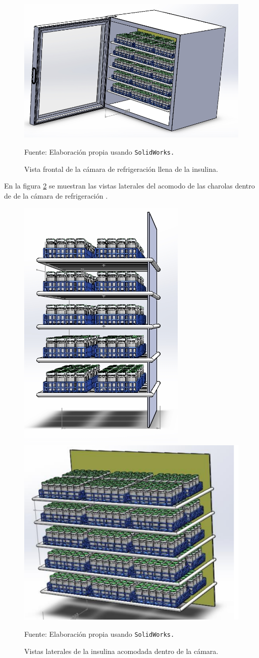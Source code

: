 \begin{figure}[H]
	\centering
	\includegraphics[width=0.6\linewidth]{figures/4-frontalcharolas}
	\caption{Vista frontal de la cámara de refrigeración llena de la insulina.}
	Fuente: Elaboración propia usando \texttt{SolidWorks.}
	\label{fig:4-frontalcharolas}
\end{figure}


En la figura \ref{fig:4-lateralcharolas1} se muestran las vistas laterales del acomodo de las charolas dentro de de la cámara de refrigeración    .

\begin{figure}[H]
	\centering
	\includegraphics[width=0.4\linewidth]{figures/4-lateralcharolas1}\includegraphics[width=0.5\linewidth]{figures/4-lateralcharolas2}
	\caption{Vistas laterales de la insulina acomodada dentro de la cámara.}
		Fuente: Elaboración propia usando \texttt{SolidWorks.}
	\label{fig:4-lateralcharolas1}
\end{figure}
 

